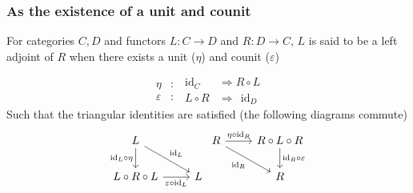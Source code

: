 \subsubsection*{As the existence of a unit and counit}
For categories $C,D$ and functors $L: C\to D$ and $R: D\to C$, $L$ is said to
be a left adjoint of $R$ when there exists a unit ($\eta$) and counit
($\varepsilon$)

\begin{equation*}
  \begin{aligned}
    \eta&:\\
    \varepsilon&:
  \end{aligned}
  \ \begin{aligned}
    \mathrm{id}_C\ \ &\Rightarrow R \circ L\\
    L \circ R &\Rightarrow\ \ \mathrm{id}_D
  \end{aligned}
\end{equation*}
Such that the triangular identities are satisfied (the following diagrams commute)
\[\begin{tikzcd}
	L \\
	{L\circ R\circ L} & L
	\arrow["{\mathrm{id}_L\circ\eta}"', from=1-1, to=2-1]
	\arrow["{\varepsilon\circ \mathrm{id}_L}"', from=2-1, to=2-2]
	\arrow["{\mathrm{id}_L}", from=1-1, to=2-2]
\end{tikzcd}
\begin{tikzcd}
	R & {R\circ L\circ R} \\
	& R
	\arrow["{\eta\circ\mathrm{id}_R}", from=1-1, to=1-2]
	\arrow["{\mathrm{id}_R \circ \varepsilon}", from=1-2, to=2-2]
	\arrow["{\mathrm{id}_R}"', from=1-1, to=2-2]
\end{tikzcd}\]

